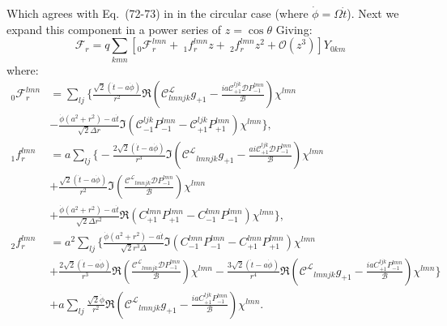 \documentclass[preprint,showpacs,preprintnumbers,amssymb,superscriptaddress,aps,prd,nofootinbib,11pt]{revtex4-1}
\begin{document}
Which agrees with Eq.~(72-73) in \cite{TorresDolan2022} in the circular case (where $\dot{\phi} = \Omega \dot{t}$). Next we expand this component in a power series of $z=\cos\theta$ Giving:
\begin{equation}
    \mathcal{F}_r = q \sum\limits_{kmn} \left[ {}_0\mathcal{F}_r^{lmn} +\  {}_1f_r^{lmn} z +\  {}_2f_r^{lmn} z^2+ \mathcal{O}(z^3) \right]Y_{0km}
\end{equation}
where:
\begin{align}
   \nonumber {}_0\mathcal{F}_r^{lmn} &= \sum\limits_{lj} \Bigg\{\frac{\sqrt{2} (\dot{t} - a \dot{\phi})}{r^2} \Re{\left(\mathcal{C}^\mathcal{L}_{lmnjk}g_{+1} - \frac{i a \mathcal{C}_{+1}^{ljk} \mathcal{D} P_{-1}^{lmn}}{\mathcal{B}}\right)\chi^{lmn}} \\&- \frac{\dot{\phi} (a^2 + r^2) - a \dot{t}}{\sqrt{2}\Delta r} \Im{\left(\mathcal{C}_{-1}^{ljk}P_{-1}^{lmn}- \mathcal{C}_{+1}^{ljk} P_{+1}^{lmn} \right)\chi^{lmn}}\Bigg\},\\
   \nonumber {}_1f_r^{lmn} &= a  \sum\limits_{lj} \Bigg\{-\frac{2 \sqrt{2} (\dot{t} - a \dot{\phi})}{r^3} \Im{\left(\mathcal{C^L}_{lmnjk} g_{+1} - \frac{ai\mathcal{C}_{+1}^{ljk}\mathcal{D}P_{-1}^{lmn}}{\mathcal{B}}\right)\chi^{lmn}}\\
   \nonumber&+ \frac{\sqrt{2} (\dot{t}-a\dot{\phi})}{r^2} \Im{\left(\frac{\mathcal{C^L}_{lmnjk}\mathcal{D}P_{-1}^{lmn}}{\mathcal{B}}\right) \chi^{lmn}} \\ &+ \frac{\dot{\phi} (a^2 +r^2) - a \dot{t}}{\sqrt{2} \Delta r^2} \Re{\left(C_{+1}^{lmn} P_{+1}^{lmn}  - C_{-1}^{lmn} P_{-1}^{lmn} \right)\chi^{lmn}}\Bigg\},\\
   \nonumber {}_2f_r^{lmn} &= a^2 \sum\limits_{lj}\Bigg \{ \frac{\dot{\phi} (a^2 + r^2)-a \dot{t}}{\sqrt{2} r^3 \Delta} \Im{\left(C_{-1}^{lmn} P_{-1}^{lmn}  - C_{+1}^{lmn} P_{+1}^{lmn} \right)\chi^{lmn}}\\ 
   \nonumber &+ \frac{2 \sqrt{2} (\dot{t} -a \dot{\phi})}{r^3} \Re{\left(\frac{\mathcal{C^L}_{lmnjk} \mathcal{D}P_{-1}^{lmn}}{\mathcal{B}}\right)\chi^{lmn}} - \frac{3 \sqrt{2} (\dot{t} -a \dot{\phi})}{r^4} \Re{\left(\mathcal{C^L}_{lmnjk} g_{+1} - \frac{i a C_{+1}^{ljk}P_{-1}^{lmn}}{\mathcal{B}}\right)\chi^{lmn}} \Bigg\}\\
   &+ a \sum\limits_{lj} \frac{\sqrt{2} \dot{\phi}}{r^2} \Re{\left(\mathcal{C^L}_{lmnjk} g_{+1} - \frac{i a C_{+1}^{ljk}P_{-1}^{lmn}}{\mathcal{B}}\right)\chi^{lmn}}.
\end{align}

\newpage
\appendix
\end{document}
